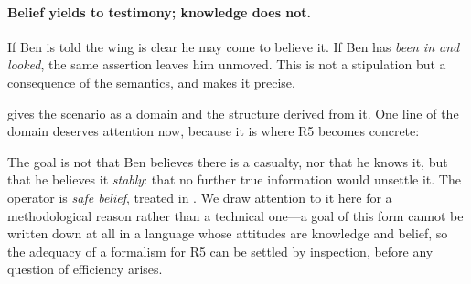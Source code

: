 \documentclass[11pt,a4paper]{article}
\begin{document}
\paragraph{Belief yields to testimony; knowledge does not.}
If Ben is told the wing is clear he may come to believe it. If Ben has \emph{been in and looked},
the same assertion leaves him unmoved. This is not a stipulation but a consequence of the
semantics, and  makes it precise.

 gives the scenario as a \delhi{} domain and  the structure derived
from it. One line of the domain deserves attention now, because it is where R5 becomes concrete:

\begin{center}
\end{center}

The goal is not that Ben believes there is a casualty, nor that he knows it, but that he believes
it \emph{stably}: that no further true information would unsettle it. The operator is \emph{safe
belief}, treated in . We draw attention to it here for a methodological reason
rather than a technical one---a goal of this form cannot be written down at all in a language
whose attitudes are knowledge and belief, so the adequacy of a formalism for R5 can be settled by
inspection, before any question of efficiency arises.
\end{document}
